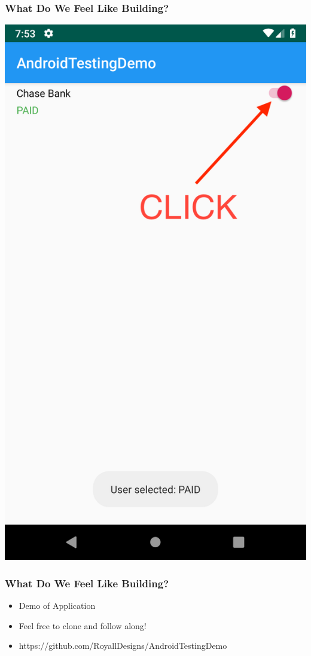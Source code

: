 \documentclass[10pt]{beamer}
\begin{document}
\begin{frame}
    \frametitle{What Do We Feel Like Building?}
    \center\includegraphics[scale=0.11]{ui_after_click}
\end{frame}

\begin{frame}
    \frametitle{What Do We Feel Like Building?}
    \begin{itemize}
        \item Demo of Application
        \item Feel free to clone and follow along!
        \item https://github.com/RoyallDesigns/AndroidTestingDemo
    \end{itemize}
\end{frame}
\end{document}
